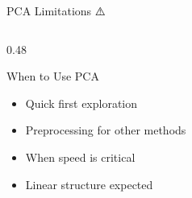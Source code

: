 \documentclass[aspectratio=169]{beamer}
\begin{document}
\begin{frame}[shrink=10]{PCA Limitations ⚠️}
\begin{columns}[T]
\begin{column}{0.48\textwidth}
\vspace{1em}
\begin{alertblock}{When to Use PCA}
\begin{itemize}\setlength{\itemsep}{0pt}
    \item Quick first exploration
    \item Preprocessing for other methods
    \item When speed is critical
    \item Linear structure expected
\end{itemize}
\end{alertblock}
\end{column}
\end{columns}
\end{frame}

\end{document}
